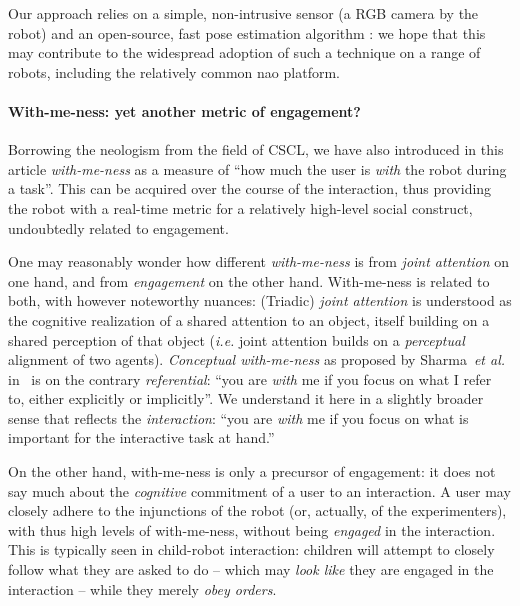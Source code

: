 \documentclass{sig-alternate}
\newcommand{\etal}{\textit{et al.}\xspace}
\newcommand{\ie}{\textit{i.e.}\xspace}
\begin{document}
Our approach relies on a simple, non-intrusive sensor (a RGB camera by the
robot) and an open-source, fast pose estimation algorithm
: we hope that this may contribute to the widespread
adoption of such a technique on a range of robots, including the relatively
common {\sc nao} platform.


\paragraph{With-me-ness: yet another metric of engagement?}

Borrowing the neologism from the field of CSCL, we have also introduced in this
article \emph{with-me-ness} as a measure of ``how much the user is \emph{with}
the robot during a task''. This can be acquired over the course of the
interaction, thus providing the robot with a real-time metric for a relatively
high-level social construct, undoubtedly related to engagement.

One may reasonably wonder how different \emph{with-me-ness} is from \emph{joint
attention} on one hand, and from \emph{engagement} on the other hand.
With-me-ness is related to both, with however noteworthy nuances: (Triadic)
\emph{joint attention} is understood as the cognitive realization of a shared
attention to an object, itself building on a shared perception of that object
(\ie joint attention builds on a \emph{perceptual} alignment of two agents).
\emph{Conceptual with-me-ness} as proposed by Sharma~\etal
in~\cite{sharma2014me} is on the contrary \emph{referential}: ``you are
\emph{with} me if you focus on what I refer to, either explicitly or
implicitly''. We understand it here in a slightly broader sense that reflects
the \emph{interaction}: ``you are \emph{with} me if you focus on what is
important for the interactive task at hand.''

On the other hand, with-me-ness is only a precursor of engagement: it does not
say much about the \emph{cognitive} commitment of a user to an interaction. A
user may closely adhere to the injunctions of the robot (or, actually, of the
experimenters), with thus high levels of with-me-ness,  without being
\emph{engaged} in the interaction. This is typically seen in child-robot
interaction: children will attempt to closely follow what they are asked to do
-- which may \emph{look like} they are engaged in the interaction -- while they
merely \emph{obey orders}.
\end{document}
